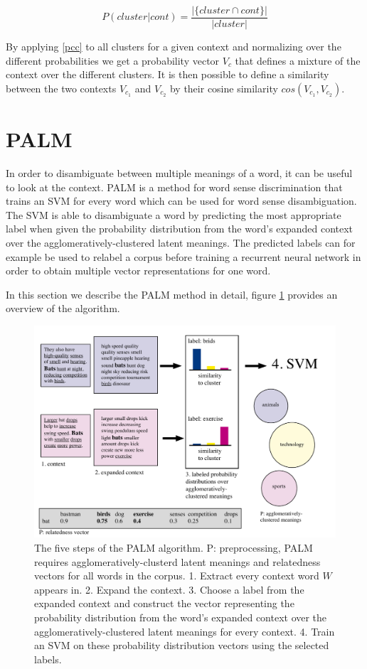 \documentclass[11pt]{article}
\begin{document}
\begin{equation} \label{pcc}P( cluster | cont ) = \frac{ | \{cluster \cap cont\} |  }{| cluster |} \end{equation}

By applying \ref{pcc} to all clusters for a given context and normalizing over the different probabilities we get a probability vector $V_{c}$ that defines a mixture of the context over the different clusters. It is then possible to define a similarity between the two contexts $V_{c_1}$ and $V_{c_2}$ by their cosine similarity $cos(V_{c_1}, V_{c_2})$.

\section{PALM}
In order to disambiguate between multiple meanings of a word, it can be useful to look at the context. PALM is a method for word sense discrimination that trains an SVM for every word which can be used for word sense disambiguation. The SVM is able to disambiguate a word by predicting the most appropriate label when given the probability distribution from the word's expanded context over the agglomeratively-clustered latent meanings. The predicted labels can for example be used to relabel a corpus before training a recurrent neural network in order to obtain multiple vector representations for one word. 

In this section we describe the PALM method in detail, figure \ref{palmimg} provides an overview of the algorithm. 
\begin{figure}
\center
\includegraphics[scale=0.5]{images/palm.pdf}
\caption{The five steps of the PALM algorithm. P: preprocessing, PALM requires agglomeratively-clusterd latent meanings and relatedness vectors for all words in the corpus. 1. Extract every context word $W$ appears in. 2. Expand the context. 3. Choose a label from the expanded context and construct the vector representing the probability distribution from the word's expanded context over the agglomeratively-clustered latent meanings for every context. 4. Train an SVM on these probability distribution vectors using the selected labels.}
\label{palmimg}
\end{figure}
\end{document}
